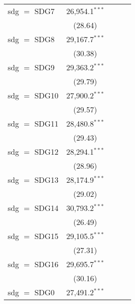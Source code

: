 \begin{tabular}{lcccc}
   sdg $=$ SDG7  & 26,954.1$^{***}$ &                  &                  &   \\   
                 & (28.64)          &                  &                  &   \\   
   sdg $=$ SDG8  & 29,167.7$^{***}$ &                  &                  &   \\   
                 & (30.38)          &                  &                  &   \\   
   sdg $=$ SDG9  & 29,363.2$^{***}$ &                  &                  &   \\   
                 & (29.79)          &                  &                  &   \\   
   sdg $=$ SDG10 & 27,900.2$^{***}$ &                  &                  &   \\   
                 & (29.57)          &                  &                  &   \\   
   sdg $=$ SDG11 & 28,480.8$^{***}$ &                  &                  &   \\   
                 & (29.43)          &                  &                  &   \\   
   sdg $=$ SDG12 & 28,294.1$^{***}$ &                  &                  &   \\   
                 & (28.96)          &                  &                  &   \\   
   sdg $=$ SDG13 & 28,174.9$^{***}$ &                  &                  &   \\   
                 & (29.02)          &                  &                  &   \\   
   sdg $=$ SDG14 & 30,793.2$^{***}$ &                  &                  &   \\   
                 & (26.49)          &                  &                  &   \\   
   sdg $=$ SDG15 & 29,105.5$^{***}$ &                  &                  &   \\   
                 & (27.31)          &                  &                  &   \\   
   sdg $=$ SDG16 & 29,695.7$^{***}$ &                  &                  &   \\   
                 & (30.16)          &                  &                  &   \\   
   sdg $=$ SDG0  & 27,491.2$^{***}$ &                  &                  &   \\   

\end{tabular}

